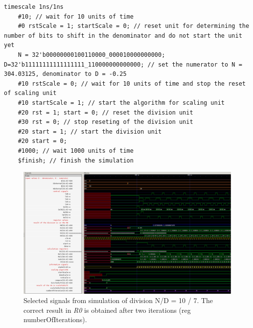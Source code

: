 \documentclass[a4paper, twoside, 11pt]{article}
\begin{document}
\begin{lstlisting}[language={pseudocode}, caption={Pseudocode snippet for the Verilog simulation test bench.}, label= {lst:division-testbench-verilog-pseudocode}]
    timescale 1ns/1ns 
    #10; // wait for 10 units of time
    #0 rstScale = 1; startScale = 0; // reset unit for determining the number of bits to shift in the denominator and do not start the unit yet
    N = 32'b00000000100110000_000010000000000; D=32'b11111111111111111_110000000000000; // set the numerator to N = 304.03125, denominator to D = -0.25
    #10 rstScale = 0; // wait for 10 units of time and stop the reset of scaling unit
    #10 startScale = 1; // start the algorithm for scaling unit
    #20 rst = 1; start = 0; // reset the division unit
    #30 rst = 0; // stop reseting of the division unit
    #20 start = 1; // start the division unit
    #20 start = 0;
    #1000; // wait 1000 units of time
    $finish; // finish the simulation
\end{lstlisting}

\begin{figure}[htbp!]
  \centering
  \includegraphics[width=1\textwidth]{src/png/division-10-div-7.png}
    \caption{Selected signals from simulation of division N/D = 10 / 7. The correct result in \textit{R0} is obtained after two iterations (reg numberOfIterations).}
  \label{fig:division-10-div-7}
\end{figure}
\end{document}
